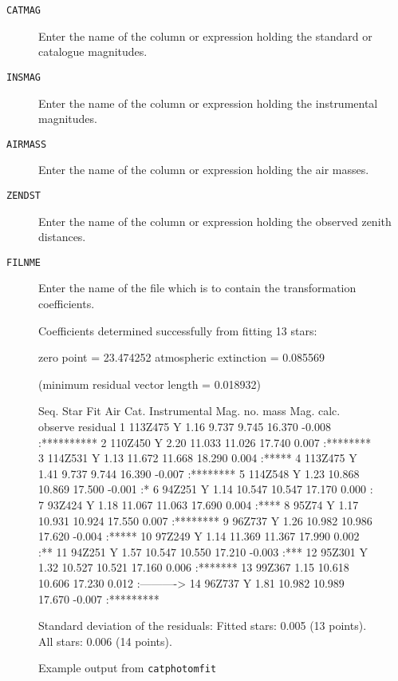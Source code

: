 \documentclass[twoside,11pt]{starlink}
\begin{document}
\begin{description}
  \item[ \texttt{CATMAG} ] Enter the name of the column or expression holding
   the standard or catalogue magnitudes.

  \item[ \texttt{INSMAG} ] Enter the name of the column or expression
   holding the instrumental magnitudes.

  \item[ \texttt{AIRMASS} ] Enter the name of the column or expression
   holding the air masses.

  \item[ \texttt{ZENDST} ] Enter the name of the column or expression
   holding the observed zenith distances.

  \item[ \texttt{FILNME} ] Enter the name of the file which is to contain
   the transformation coefficients.

\end{description}

\begin{figure}[htbp]

\begin{terminalv}

Coefficients determined successfully from fitting 13 stars:

 zero point = 23.474252
 atmospheric extinction = 0.085569

 (minimum residual vector length = 0.018932)

Seq.  Star         Fit Air      Cat.       Instrumental Mag.
no.                    mass     Mag.    calc.  observe residual
  1  113Z475        Y  1.16    9.737    9.745  16.370  -0.008 :**********
  2  110Z450        Y  2.20   11.033   11.026  17.740   0.007 :********
  3  114Z531        Y  1.13   11.672   11.668  18.290   0.004 :*****
  4  113Z475        Y  1.41    9.737    9.744  16.390  -0.007 :********
  5  114Z548        Y  1.23   10.868   10.869  17.500  -0.001 :*
  6  94Z251         Y  1.14   10.547   10.547  17.170   0.000 :
  7  93Z424         Y  1.18   11.067   11.063  17.690   0.004 :****
  8  95Z74          Y  1.17   10.931   10.924  17.550   0.007 :********
  9  96Z737         Y  1.26   10.982   10.986  17.620  -0.004 :*****
 10  97Z249         Y  1.14   11.369   11.367  17.990   0.002 :**
 11  94Z251         Y  1.57   10.547   10.550  17.210  -0.003 :***
 12  95Z301         Y  1.32   10.527   10.521  17.160   0.006 :*******
 13  99Z367            1.15   10.618   10.606  17.230   0.012 :---------->
 14  96Z737         Y  1.81   10.982   10.989  17.670  -0.007 :*********

Standard deviation of the residuals:
   Fitted stars:  0.005       (13 points).
   All stars:     0.006       (14 points).
\end{terminalv}

\caption{Example output from \texttt{catphotomfit} \label{PHOTOFITOUT} }

\end{figure}
\end{document}
